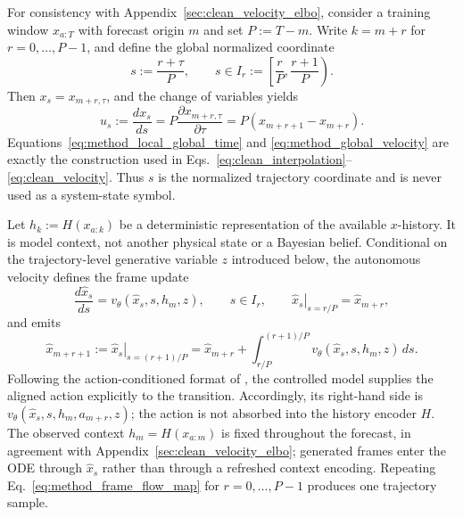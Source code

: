 For consistency with Appendix~\ref{sec:clean_velocity_elbo}, consider a
training window $x_{a:T}$ with forecast origin $m$ and set $P:=T-m$.  Write
$k=m+r$ for $r=0,\ldots,P-1$, and define the global normalized coordinate
\begin{equation}
  s:=\frac{r+\tau}{P},
  \qquad
  s\in I_r:=\left[\frac rP,\frac{r+1}{P}\right).
  \label{eq:method_local_global_time}
\end{equation}
Then $x_s=x_{m+r,\tau}$, and the change of variables yields
\begin{equation}
  u_s:=\frac{dx_s}{ds}
  =P\frac{\partial x_{m+r,\tau}}{\partial\tau}
  =P(x_{m+r+1}-x_{m+r}).
  \label{eq:method_global_velocity}
\end{equation}
Equations~\ref{eq:method_local_global_time} and
\ref{eq:method_global_velocity} are exactly the construction used in
Eqs.~\ref{eq:clean_interpolation}--\ref{eq:clean_velocity}.  Thus $s$ is the
normalized trajectory coordinate and is never used as a system-state symbol.

Let $h_k:=H(x_{a:k})$ be a deterministic representation of the available
$x$-history.  It is model context, not another physical state or a Bayesian
belief.  Conditional on the trajectory-level generative variable $z$
introduced below, the autonomous velocity defines the frame update
\begin{equation}
  \frac{d\widehat x_s}{ds}
  =v_\theta(\widehat x_s,s,h_m,z),
  \qquad
  s\in I_r,
  \qquad
  \left.\widehat x_s\right|_{s=r/P}=\widehat x_{m+r},
  \label{eq:method_frame_flow_ode}
\end{equation}
and emits
\begin{equation}
  \widehat x_{m+r+1}
  :=\left.\widehat x_s\right|_{s=(r+1)/P}
  =\widehat x_{m+r}
   +\int_{r/P}^{(r+1)/P}
      v_\theta(\widehat x_s,s,h_m,z)\,ds.
  \label{eq:method_frame_flow_map}
\end{equation}
Following the action-conditioned format of \citet{maes2026leworldmodel}, the
controlled model supplies the aligned action explicitly to the transition.
Accordingly, its right-hand side is
$v_\theta(\widehat x_s,s,h_m,a_{m+r},z)$; the action is not
absorbed into the history encoder $H$.
The observed context $h_m=H(x_{a:m})$ is fixed throughout the forecast, in
agreement with Appendix~\ref{sec:clean_velocity_elbo}; generated frames enter
the ODE through $\widehat x_s$ rather than through a refreshed context
encoding.  Repeating Eq.~\ref{eq:method_frame_flow_map} for
$r=0,\ldots,P-1$ produces one trajectory sample.

